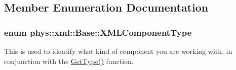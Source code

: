 \subsection{Member Enumeration Documentation}
\hypertarget{classphys_1_1xml_1_1Base_a62ba0484b5ecb502f9ae9d82d3720320}{
\subsubsection[{XMLComponentType}]{\setlength{\rightskip}{0pt plus 5cm}enum {\bf phys::xml::Base::XMLComponentType}}}
\label{df/d10/classphys_1_1xml_1_1Base_a62ba0484b5ecb502f9ae9d82d3720320}


This is used to identify what kind of component you are working with, in conjunction with the \hyperlink{classphys_1_1xml_1_1Base_af2821c239b5eb31c2524a499bf3ff19f}{GetType()} function. 

